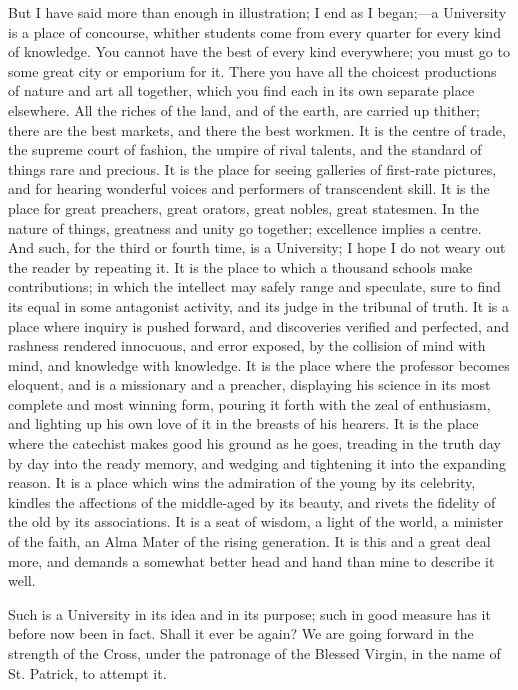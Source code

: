 But I have said more than enough in illustration; I end as I began;—a
University is a place of concourse, whither students come from every
quarter for every kind of knowledge. You cannot have the best of every
kind everywhere; you must go to some great city or emporium for it.
There you have all the choicest productions of nature and art all
together, which you find each in its own separate place elsewhere. All
the riches of the land, and of the earth, are carried up thither;
there are the best markets, and there the best workmen. It is the
centre of trade, the supreme court of fashion, the umpire of rival
talents, and the standard of things rare and precious. It is the place
for seeing galleries of first-rate pictures, and for hearing wonderful
voices and performers of transcendent skill. It is the place for great
preachers, great orators, great nobles, great statesmen. In the nature
of things, greatness and unity go together; excellence implies a
centre. And such, for the third or fourth time, is a University; I
hope I do not weary out the reader by repeating it. It is the place to
which a thousand schools make contributions; in which the intellect
may safely range and speculate, sure to find its equal in some
antagonist activity, and its judge in the tribunal of truth. It is a
place where inquiry is pushed forward, and discoveries verified and
perfected, and rashness rendered innocuous, and error exposed, by the
collision of mind with mind, and knowledge with knowledge. It is the
place where the professor becomes eloquent, and is a missionary and a
preacher, displaying his science in its most complete and most winning
form, pouring it forth with the zeal of enthusiasm, and lighting up
his own love of it in the breasts of his hearers. It is the place
where the catechist makes good his ground as he goes, treading in the
truth day by day into the ready memory, and wedging and tightening it
into the expanding reason. It is a place which wins the admiration of
the young by its celebrity, kindles the affections of the middle-aged
by its beauty, and rivets the fidelity of the old by its associations.
It is a seat of wisdom, a light of the world, a minister of the faith,
an Alma Mater of the rising generation. It is this and a great deal
more, and demands a somewhat better head and hand than mine to
describe it well.

Such is a University in its idea and in its purpose; such in
good measure has it before now been in fact. Shall it ever be again?
We are going forward in the strength of the Cross, under the patronage
of the Blessed Virgin, in the name of St. Patrick, to attempt it.

